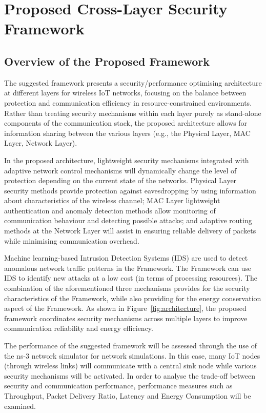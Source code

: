 \documentclass[a4paper,fleqn]{cas-dc}
\numberwithin{equation}{section}
\begin{document}
\section{Proposed Cross-Layer Security Framework}

\subsection{Overview of the Proposed Framework}

The suggested framework presents a security/performance optimising architecture at different layers for wireless IoT networks, focusing on the balance between protection and communication efficiency in resource-constrained environments. Rather than treating security mechanisms within each layer purely as stand-alone components of the communication stack, the proposed architecture allows for information sharing between the various layers (e.g., the Physical Layer, MAC Layer, Network Layer).

In the proposed architecture, lightweight security mechanisms integrated with adaptive network control mechanisms will dynamically change the level of protection depending on the current state of the networks. Physical Layer security methods provide protection against eavesdropping by using information about characteristics of the wireless channel; MAC Layer lightweight authentication and anomaly detection methods allow monitoring of communication behaviour and detecting possible attacks; and adaptive routing methods at the Network Layer will assist in ensuring reliable delivery of packets while minimising communication overhead.


Machine learning-based Intrusion Detection Systems (IDS) are used to detect anomalous network traffic patterns in the Framework. The Framework can use IDS to identify new attacks at a low cost (in terms of processing resources). The combination of the aforementioned three mechanisms provides for the security characteristics of the Framework, while also providing for the energy conservation aspect of the Framework.
As shown in Figure~\ref{fig:architecture}, the proposed framework coordinates security mechanisms across multiple layers to improve communication reliability and energy efficiency.

The performance of the suggested framework will be assessed through the use of the ns-3 network simulator for network simulations. In this case, many IoT nodes (through wireless links) will communicate with a central sink node while various security mechanisms will be activated. In order to analyse the trade-off between security and communication performance, performance measures such as Throughput, Packet Delivery Ratio, Latency and Energy Consumption will be examined.
\end{document}

